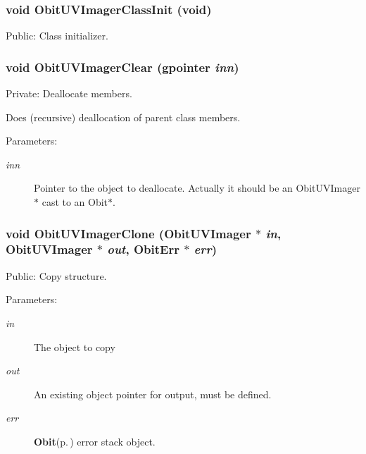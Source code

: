 \subsubsection{\setlength{\rightskip}{0pt plus 5cm}void Obit\-UVImager\-Class\-Init (void)}\label{ObitUVImager_8c_a18}


Public: Class initializer. 

\subsubsection{\setlength{\rightskip}{0pt plus 5cm}void Obit\-UVImager\-Clear (gpointer {\em inn})}\label{ObitUVImager_8c_a4}


Private: Deallocate members. 

Does (recursive) deallocation of parent class members. \begin{Desc}
\item[Parameters:]
\begin{description}
\item[{\em inn}]Pointer to the object to deallocate. Actually it should be an Obit\-UVImager$\ast$ cast to an Obit$\ast$. \end{description}
\end{Desc}
\subsubsection{\setlength{\rightskip}{0pt plus 5cm}void Obit\-UVImager\-Clone ({\bf Obit\-UVImager} $\ast$ {\em in}, {\bf Obit\-UVImager} $\ast$ {\em out}, {\bf Obit\-Err} $\ast$ {\em err})}\label{ObitUVImager_8c_a10}


Public: Copy structure. 

\begin{Desc}
\item[Parameters:]
\begin{description}
\item[{\em in}]The object to copy \item[{\em out}]An existing object pointer for output, must be defined. \item[{\em err}]{\bf Obit}{\rm (p.\,\pageref{structObit})} error stack object. \end{description}
\end{Desc}
